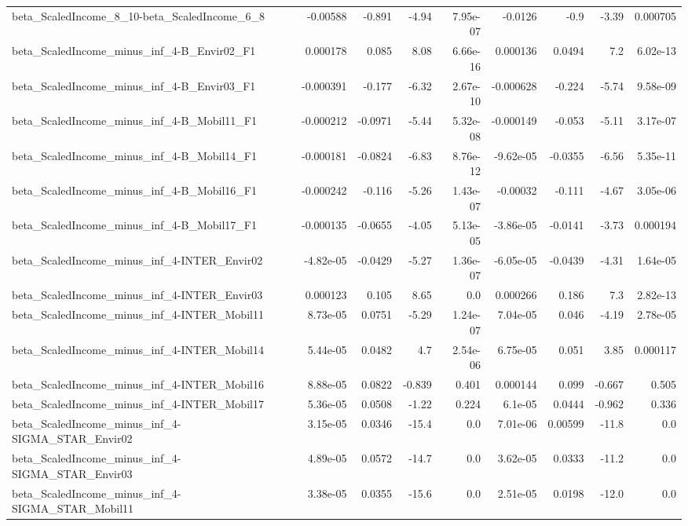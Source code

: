 \begin{tabular}{lrrrrrrrr}
beta_ScaledIncome_8_10-beta_ScaledIncome_6_8 & -0.00588 & -0.891 & -4.94 & 7.95e-07 & -0.0126 & -0.9 & -3.39 & 0.000705 \\
beta_ScaledIncome_minus_inf_4-B_Envir02_F1 & 0.000178 & 0.085 & 8.08 & 6.66e-16 & 0.000136 & 0.0494 & 7.2 & 6.02e-13 \\
beta_ScaledIncome_minus_inf_4-B_Envir03_F1 & -0.000391 & -0.177 & -6.32 & 2.67e-10 & -0.000628 & -0.224 & -5.74 & 9.58e-09 \\
beta_ScaledIncome_minus_inf_4-B_Mobil11_F1 & -0.000212 & -0.0971 & -5.44 & 5.32e-08 & -0.000149 & -0.053 & -5.11 & 3.17e-07 \\
beta_ScaledIncome_minus_inf_4-B_Mobil14_F1 & -0.000181 & -0.0824 & -6.83 & 8.76e-12 & -9.62e-05 & -0.0355 & -6.56 & 5.35e-11 \\
beta_ScaledIncome_minus_inf_4-B_Mobil16_F1 & -0.000242 & -0.116 & -5.26 & 1.43e-07 & -0.00032 & -0.111 & -4.67 & 3.05e-06 \\
beta_ScaledIncome_minus_inf_4-B_Mobil17_F1 & -0.000135 & -0.0655 & -4.05 & 5.13e-05 & -3.86e-05 & -0.0141 & -3.73 & 0.000194 \\
beta_ScaledIncome_minus_inf_4-INTER_Envir02 & -4.82e-05 & -0.0429 & -5.27 & 1.36e-07 & -6.05e-05 & -0.0439 & -4.31 & 1.64e-05 \\
beta_ScaledIncome_minus_inf_4-INTER_Envir03 & 0.000123 & 0.105 & 8.65 & 0.0 & 0.000266 & 0.186 & 7.3 & 2.82e-13 \\
beta_ScaledIncome_minus_inf_4-INTER_Mobil11 & 8.73e-05 & 0.0751 & -5.29 & 1.24e-07 & 7.04e-05 & 0.046 & -4.19 & 2.78e-05 \\
beta_ScaledIncome_minus_inf_4-INTER_Mobil14 & 5.44e-05 & 0.0482 & 4.7 & 2.54e-06 & 6.75e-05 & 0.051 & 3.85 & 0.000117 \\
beta_ScaledIncome_minus_inf_4-INTER_Mobil16 & 8.88e-05 & 0.0822 & -0.839 & 0.401 & 0.000144 & 0.099 & -0.667 & 0.505 \\
beta_ScaledIncome_minus_inf_4-INTER_Mobil17 & 5.36e-05 & 0.0508 & -1.22 & 0.224 & 6.1e-05 & 0.0444 & -0.962 & 0.336 \\
beta_ScaledIncome_minus_inf_4-SIGMA_STAR_Envir02 & 3.15e-05 & 0.0346 & -15.4 & 0.0 & 7.01e-06 & 0.00599 & -11.8 & 0.0 \\
beta_ScaledIncome_minus_inf_4-SIGMA_STAR_Envir03 & 4.89e-05 & 0.0572 & -14.7 & 0.0 & 3.62e-05 & 0.0333 & -11.2 & 0.0 \\
beta_ScaledIncome_minus_inf_4-SIGMA_STAR_Mobil11 & 3.38e-05 & 0.0355 & -15.6 & 0.0 & 2.51e-05 & 0.0198 & -12.0 & 0.0 \\

\end{tabular}
